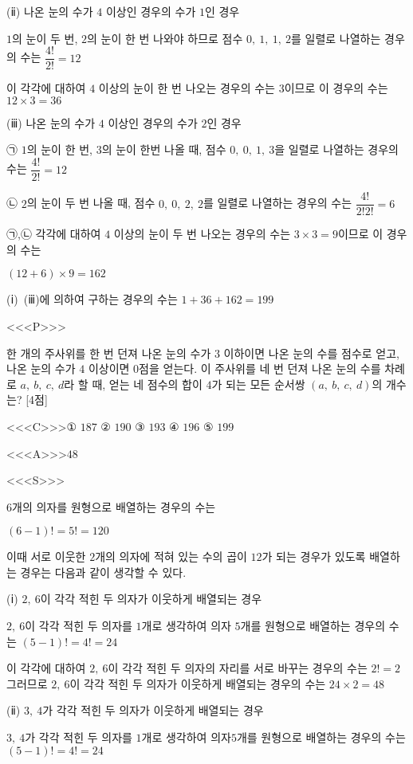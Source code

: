 \documentclass{oblivoir}
\begin{document}
(ⅱ) 나온 눈의 수가 $4$ 이상인 경우의 수가 $1$인 경우

$1$의 눈이 두 번, $2$의 눈이 한 번 나와야 하므로 점수 $0,\: 1,\: 1,\: 2$를 일렬로 나열하는 경우의 수는 $\dfrac{4!}{2!}=12$

이 각각에 대하여 $4$ 이상의 눈이 한 번 나오는 경우의 수는 $3$이므로 이 경우의 수는 $12\times 3=36$

(ⅲ) 나온 눈의 수가 $4$ 이상인 경우의 수가 $2$인 경우

㉠ $1$의 눈이 한 번, $3$의 눈이 한번 나올 때, 점수 $0,\: 0,\: 1,\: 3$을 일렬로 나열하는 경우의 수는 $\dfrac{4!}{2!}=12$

㉡ $2$의 눈이 두 번 나올 때, 점수 $0,\: 0,\: 2,\: 2$를 일렬로 나열하는 경우의 수는 $\dfrac{4!}{2!2!}=6$

㉠,㉡ 각각에 대하여 $4$ 이상의 눈이 두 번 나오는 경우의 수는 $3\times 3=9$이므로 이 경우의 수는

$(12+6)\times 9=162$

(ⅰ)~(ⅲ)에 의하여 구하는 경우의 수는 $1+36+162=199$

<<<P>>>

한 개의 주사위를 한 번 던져 나온 눈의 수가 $3$ 이하이면 나온 눈의 수를 점수로 얻고, 나온 눈의 수가 $4$ 이상이면 $0$점을 얻는다. 이 주사위를 네 번 던져 나온 눈의 수를 차례로 $a,\: b,\: c,\: d$라 할 때, 얻는 네 점수의 합이 $4$가 되는 모든 순서쌍 $(a,\: b,\: c,\: d)$의 개수는? [4점]

<<<C>>>① $187$ ② $190$ ③ $193$ ④ $196$ ⑤ $199$

<<<A>>>$48$

<<<S>>>

$6$개의 의자를 원형으로 배열하는 경우의 수는

$(6-1)! =5! = 120$

이때 서로 이웃한 $2$개의 의자에 적혀 있는 수의 곱이 $12$가 되는 경우가 있도록 배열하는 경우는 다음과 같이 생각할 수 있다.

(ⅰ) $2,\: 6$이 각각 적힌 두 의자가 이웃하게 배열되는 경우

$2,\: 6$이 각각 적힌 두 의자를 $1$개로 생각하여 의자 $5$개를 원형으로 배열하는 경우의 수는 $(5-1)! =4! =24$

이 각각에 대하여 $2,\: 6$이 각각 적힌 두 의자의 자리를 서로 바꾸는 경우의 수는 $2! =2$ 
그러므로 $2,\: 6$이 각각 적힌 두 의자가 이웃하게 배열되는 경우의 수는 $24\times 2=48$

(ⅱ) $3,\: 4$가 각각 적힌 두 의자가 이웃하게 배열되는 경우

$3,\: 4$가 각각 적힌 두 의자를 $1$개로 생각하여 의자$5$개를 원형으로 배열하는 경우의 수는 $(5-1)! =4! =24$
\end{document}
